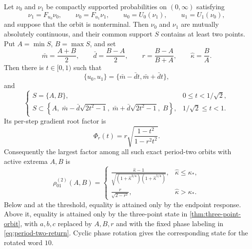 \documentclass[letterpaper,twoside]{article}
\begin{document}
\begin{theorem}
\label{thm:period-two-envelope}
Let $\nu_0$ and $\nu_1$ be compactly supported probabilities on
$(0,\infty)$ satisfying
\begin{equation}\label{eq:period-two-return}
 \nu_1=F_{u_0}\nu_0,
 \qquad \nu_0=F_{u_1}\nu_1,
 \qquad u_0=U_0(\nu_1),
 \qquad u_1=U_1(\nu_0),
\end{equation}
and suppose that the orbit is nonterminal.  Then $\nu_0$ and $\nu_1$ are
mutually absolutely continuous, and their common support $S$ contains at least
two points.  Put $A=\min S$, $B=\max S$, and set
\[
 \bar m=\frac{A+B}{2},
 \qquad \bar d=\frac{B-A}{2},
 \qquad r=\frac{B-A}{B+A},
 \qquad \widehat\kappa=\frac BA.
\]
Then there is $t\in[0,1)$ such that
\begin{equation}\label{eq:period-two-steps}
 \{u_0,u_1\}=\{\bar m-\bar d t,\bar m+\bar d t\},
\end{equation}
and
\begin{equation}\label{eq:period-two-support}
 \begin{cases}
 S=\{A,B\},
   &0\le t<1/\sqrt2,\\[1mm]
 \displaystyle
 S\subset\left\{
 A,\;\bar m-\bar d\sqrt{2t^2-1},\;
 \bar m+\bar d\sqrt{2t^2-1},\;B
 \right\},
   &1/\sqrt2\le t<1.
 \end{cases}
\end{equation}
Its per-step
gradient root factor is
\begin{equation}\label{eq:period-two-factor}
 \Phi_r(t)=r\sqrt{\frac{1-t^2}{1-r^2t^2}}.
\end{equation}
Consequently the largest factor among all such exact period-two orbits with
active extrema $A,B$ is
\begin{equation}\label{eq:period-two-envelope}
 \rho^{(2)}_{01}(A,B)=
 \begin{cases}
 \displaystyle
 \frac{\widehat\kappa-1}
 {\sqrt{(1+\widehat\kappa^{3/4})
        (1+\widehat\kappa^{5/4})}},
 &\widehat\kappa\le\kappa_*,\\[3mm]
 \displaystyle\frac{r}{\sqrt{2-r^2}},
 &\widehat\kappa>\kappa_*.
 \end{cases}
\end{equation}
Below and at the threshold, equality is attained only by the endpoint
response.  Above it, equality is attained only by the three-point state in
\cref{thm:three-point-orbit}, with $a,b,c$ replaced by $A,B,r$ and with the
fixed phase labeling in \eqref{eq:period-two-return}.  Cyclic phase rotation
gives the corresponding state for the rotated word $10$.
\end{theorem}
\end{document}
